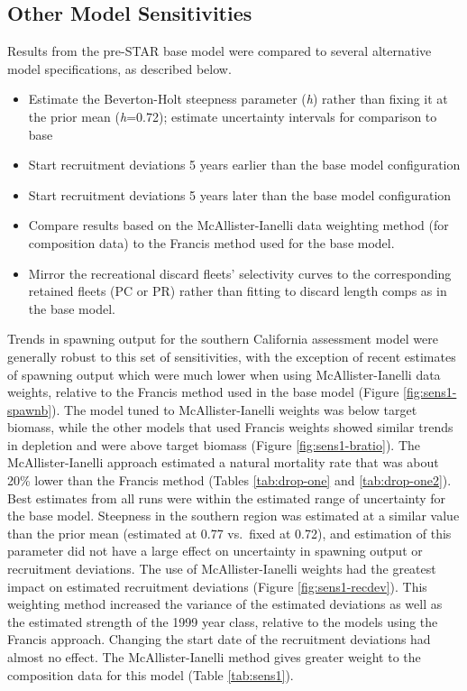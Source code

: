 \documentclass[
  english,
  a4paper,
]{article}
\providecommand{\tightlist}{%
  \setlength{\itemsep}{0pt}\setlength{\parskip}{0pt}}
\begin{document}
\hypertarget{other-model-sensitivities}{%
\subsection{Other Model Sensitivities}\label{other-model-sensitivities}}

Results from the pre-STAR base model were compared to several alternative model specifications, as described below.

\begin{itemize}
\tightlist
\item
  Estimate the Beverton-Holt steepness parameter (\emph{h}) rather than fixing it at the prior mean (\emph{h}=0.72); estimate uncertainty intervals for comparison to base
\item
  Start recruitment deviations 5 years earlier than the base model configuration
\item
  Start recruitment deviations 5 years later than the base model configuration
\item
  Compare results based on the McAllister-Ianelli data weighting method (for composition data) to the Francis method used for the base model.
\item
  Mirror the recreational discard fleets' selectivity curves to the corresponding retained fleets (PC or PR) rather than fitting to discard length comps as in the base model.
\end{itemize}

Trends in spawning output for the southern California assessment model were generally robust to this set of sensitivities, with the exception of recent estimates of spawning output which were much lower when using McAllister-Ianelli data weights, relative to the Francis method used in the base model (Figure \ref{fig:sens1-spawnb}). The model tuned to McAllister-Ianelli weights was below target biomass, while the other models that used Francis weights showed similar trends in depletion and were above target biomass (Figure \ref{fig:sens1-bratio}). The McAllister-Ianelli approach estimated a natural mortality rate that was about 20\% lower than the Francis method (Tables \ref{tab:drop-one} and \ref{tab:drop-one2}). Best estimates from all runs were within the estimated range of uncertainty for the base model. Steepness in the southern region was estimated at a similar value than the prior mean (estimated at 0.77 vs.~fixed at 0.72), and estimation of this parameter did not have a large effect on uncertainty in spawning output or recruitment deviations. The use of McAllister-Ianelli weights had the greatest impact on estimated recruitment deviations (Figure \ref{fig:sens1-recdev}). This weighting method increased the variance of the estimated deviations as well as the estimated strength of the 1999 year class, relative to the models using the Francis approach. Changing the start date of the recruitment deviations had almost no effect. The McAllister-Ianelli method gives greater weight to the composition data for this model (Table \ref{tab:sens1}).
\end{document}
